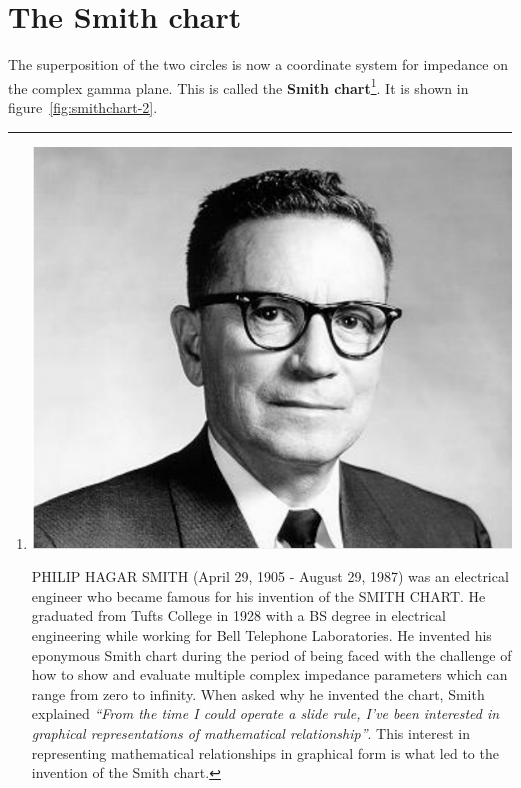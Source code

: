 \section{The Smith chart}
The superposition of the two circles is now a coordinate system for impedance on the complex gamma plane. This is called the \textbf{Smith chart}\footnote{
\includegraphics[scale=0.09]{./graphics/a21}

PHILIP HAGAR SMITH (April 29, 1905 - August 29, 1987) was an electrical engineer who became famous for his invention of the SMITH CHART. He graduated from Tufts College in 1928 with a BS degree in electrical engineering while working for Bell Telephone Laboratories. He invented his eponymous Smith chart during the period of being faced with the challenge of how to show and evaluate multiple complex impedance parameters which can range from zero to infinity. When asked why he invented the chart, Smith explained \emph{\textquotedblleft From the time I could operate a slide rule, I've been interested in graphical representations of mathematical relationship\textquotedblright}. This interest in representing mathematical relationships in graphical form is what led to the invention of the Smith chart.
}. It is shown in figure~\ref{fig:smithchart-2}.
